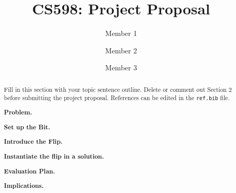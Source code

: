 \documentclass[sigconf, nonacm]{acmart}
\newcommand{\minihead}[1]{{\vspace{.45em}\noindent\textbf{#1.} }}
\begin{document}
\title{CS598: Project Proposal}

\author{Member 1}
\affiliation{%
}

\author{Member 2}
\affiliation{%
}

\author{Member 3}
\affiliation{%
}

\begin{abstract}
Fill in this section with your topic sentence outline. Delete or comment out Section 2 before submitting the project proposal. References can be edited in the \texttt{ref.bib} file.

\minihead{Problem} 

\minihead{Set up the Bit}

\minihead{Introduce the Flip}

\minihead{Instantiate the flip in a solution}

\minihead{Evaluation Plan}

\minihead{Implications}


\end{abstract}

\maketitle










\end{document}
